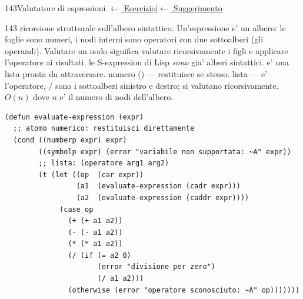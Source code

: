 \label{sol:143}
\begin{solbox}{143}{Valutatore di espressioni}
\small\color{black!55}\hyperref[ex:143]{$\leftarrow$ Esercizio}\enspace\textcolor{black!30}{|}\enspace\hyperref[hint:143]{$\leftarrow$ Suggerimento}\normalsize\color{black}
\begin{ragionamentoBox}{143}
 ricorsione strutturale sull'albero sintattico.
Un'espressione e' un albero: le foglie sono numeri,
i nodi interni sono operatori con due sottoalberi (gli operandi).
Valutare un nodo significa valutare ricorsivamente i figli
e applicare l'operatore ai risultati.
 le S-expression di Lisp \emph{sono} gia' alberi sintattici.
 e' una lista  pronta da attraversare.
 numero () — restituisce se stesso.
 lista —  e' l'operatore, /
sono i sottoalberi sinistro e destro; si valutano ricorsivamente.
 $O(n)$ dove $n$ e' il numero di nodi dell'albero.
\end{ragionamentoBox}
\begin{lstlisting}
(defun evaluate-expression (expr)
  ;; atomo numerico: restituisci direttamente
  (cond ((numberp expr) expr)
        ((symbolp expr) (error "variabile non supportata: ~A" expr))
        ;; lista: (operatore arg1 arg2)
        (t (let ((op  (car expr))
                 (a1  (evaluate-expression (cadr expr)))
                 (a2  (evaluate-expression (caddr expr))))
             (case op
               (+ (+ a1 a2))
               (- (- a1 a2))
               (* (* a1 a2))
               (/ (if (= a2 0)
                      (error "divisione per zero")
                      (/ a1 a2)))
               (otherwise (error "operatore sconosciuto: ~A" op)))))))
\end{lstlisting}
\end{solbox}


